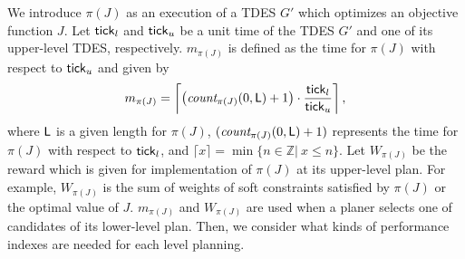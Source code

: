 \documentclass[journal,twoside,web]{IEEEtran}
\newcommand{\tick}{{\sf tick}}
\newcommand{\Len}{{\sf L}}
\begin{document}
We introduce $\pi(J)$ as an execution of a TDES $G'$ which optimizes an objective function $J$.
Let ${\tick}_{l}$ and ${\tick}_u$ be a unit time of the TDES $G'$ and one of its upper-level TDES, respectively.
$m_{\pi(J)}$ is defined as the time for $\pi(J)$ with respect to ${\tick}_{u}$ and given by
\begin{align}\label{ti}
m_{\pi(J)}=\left\lceil \left(\textit{count}_{\pi(J)}(0,\Len)+1\right)\cdot\frac{{\tick}_l}{{\tick}_{u}} \right\rceil,
\end{align}
where $\Len$ is a given length for $\pi(J)$, $(\textit{count}_{\pi(J)}(0,\Len)+1 )$ represents the time for $\pi(J)$ with respect to ${\tick}_l$, and $\lceil x \rceil =\min\{n\in\mathbb{Z}|\ x\leq n\}$.
Let $W_{\pi(J)}$ be the reward which is given for implementation of $\pi(J)$ at its upper-level plan. 
For example, $W_{\pi(J)}$ is the sum of weights of soft constraints satisfied by $\pi(J)$ or the optimal value of $J$. 
$m_{\pi(J)}$ and $W_{\pi(J)}$ are used when a planer selects one of candidates of its lower-level plan.
Then, we consider what kinds of performance indexes are needed for each level planning.
\end{document}
